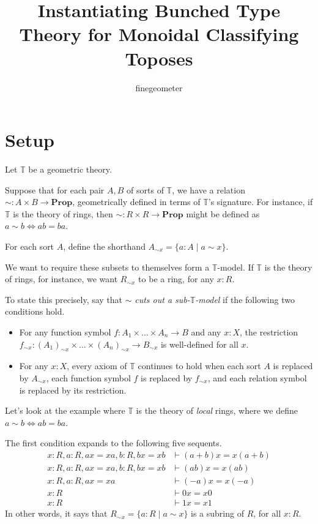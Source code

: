 \documentclass{article}
\title{Instantiating Bunched Type Theory for Monoidal Classifying Toposes}
\author{finegeometer}
\newcommand*{\T}{\mathbb{T}}
\begin{document}
\maketitle

\section{Setup}

Let \(\T\) be a geometric theory.

Suppose that for each pair \(A,B\) of sorts of \(\T\),
we have a relation \(\sim : A \times B \to \mathbf{Prop}\), geometrically defined in terms of \(\T\)'s signature.
For instance, if \(\T\) is the theory of rings, then \(\sim : R \times R \to \mathbf{Prop}\)
might be defined as \(a \sim b \iff ab = ba\).

For each sort \(A\), define the shorthand \(A_{\sim x} = \{a : A \mid a \sim x\}\).

We want to require these subsets to themselves form a \(\T\)-model.
If \(\T\) is the theory of rings, for instance, we want \(R_{\sim x}\) to be a ring, for any \(x : R\).

To state this precisely, say that \(\sim\) \emph{cuts out a sub-\(\T\)-model} if the following two conditions hold.
\begin{itemize}
    \item For any function symbol \(f : A_1 \times \dots \times A_n \to B\) and any \(x : X\),
    the restriction \(f_{\sim x} : (A_1)_{\sim x} \times \dots \times (A_n)_{\sim x} \to B_{\sim x}\) is well-defined for all \(x\).
    \item For any \(x : X\), every axiom of \(\T\) continues to hold when each sort \(A\) is replaced by \(A_{\sim x}\), each function symbol \(f\) is replaced by \(f_{\sim x}\), and each relation symbol is replaced by its restriction.
\end{itemize}

Let's look at the example where \(\T\) is the theory of \emph{local} rings,
where we define \(a \sim b \iff ab = ba\).

The first condition expands to the following five sequents.
\begin{align*}
    x : R, a : R, ax = xa, b : R, bx = xb &\vdash (a+b)x = x(a+b)
    \\ x : R, a : R, ax = xa, b : R, bx = xb &\vdash (ab)x = x(ab)
    \\ x : R, a : R, ax = xa &\vdash (-a)x = x(-a)
    \\ x : R &\vdash 0x = x0
    \\ x : R &\vdash 1x = x1
\end{align*}
In other words, it says that \(R_{\sim x} = \{a : R \mid a \sim x\}\) is a subring of \(R\), for all \(x : R\).
\end{document}
